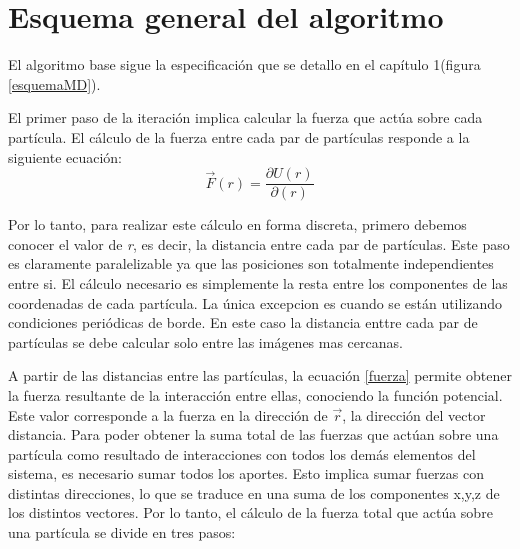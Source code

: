 \section{Esquema general del algoritmo}

El algoritmo base sigue la especificación que se detallo en el capítulo 1(figura \ref{esquemaMD}). 

El primer paso de la iteración implica calcular la fuerza que actúa sobre cada partícula. 
El cálculo de la fuerza entre cada par de partículas responde a la siguiente ecuación: \begin{equation} \label{fuerza}\vec{F}(r)=\dfrac{\partial U(r)}{ \partial(r)}\end{equation}
                                                                                                                                                   
Por lo tanto, para realizar este cálculo en forma discreta, primero debemos conocer el valor de \textit{r}, es decir, la distancia entre cada par de partículas.
Este paso es claramente paralelizable ya que las posiciones son totalmente independientes entre si. El cálculo necesario es simplemente la resta entre los componentes de las coordenadas de cada partícula.
La única excepcion es cuando se están utilizando condiciones periódicas de borde. En este caso la distancia enttre cada par de partículas se debe calcular solo entre las imágenes mas cercanas.

A partir de las distancias entre las partículas, la ecuación \ref{fuerza} permite obtener la fuerza resultante de la interacción entre ellas, conociendo la función potencial.
Este valor corresponde a la fuerza en la dirección de $\vec{r}$, la dirección del vector distancia. 
Para poder obtener la suma total de las fuerzas que actúan sobre una partícula como resultado de interacciones con todos los demás elementos del sistema,
es necesario sumar todos los aportes. Esto implica sumar fuerzas con distintas direcciones, lo que se traduce en una suma de los componentes x,y,z de los distintos vectores. 
Por lo tanto, el cálculo de la fuerza total que actúa sobre una partícula se divide en tres pasos:

